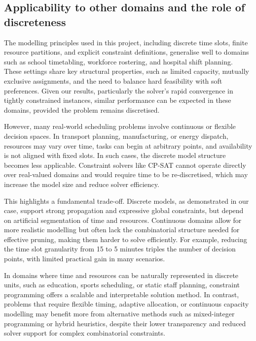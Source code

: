 \documentclass[12pt]{article}
\begin{document}
\vspace{0.5em}
\subsection{Applicability to other domains and the role of discreteness}

The modelling principles used in this project, including discrete time slots, finite resource partitions, and explicit constraint definitions, generalise well to domains such as school timetabling, workforce rostering, and hospital shift planning. These settings share key structural properties, such as limited capacity, mutually exclusive assignments, and the need to balance hard feasibility with soft preferences. Given our results, particularly the solver's rapid convergence in tightly constrained instances, similar performance can be expected in these domains, provided the problem remains discretised.

However, many real-world scheduling problems involve continuous or flexible decision spaces. In transport planning, manufacturing, or energy dispatch, resources may vary over time, tasks can begin at arbitrary points, and availability is not aligned with fixed slots. In such cases, the discrete model structure becomes less applicable. Constraint solvers like CP-SAT cannot operate directly over real-valued domains and would require time to be re-discretised, which may increase the model size and reduce solver efficiency.

This highlights a fundamental trade-off. Discrete models, as demonstrated in our case, support strong propagation and expressive global constraints, but depend on artificial segmentation of time and resources. Continuous domains allow for more realistic modelling but often lack the combinatorial structure needed for effective pruning, making them harder to solve efficiently. For example, reducing the time slot granularity from 15 to 5 minutes triples the number of decision points, with limited practical gain in many scenarios.

In domains where time and resources can be naturally represented in discrete units, such as education, sports scheduling, or static staff planning, constraint programming offers a scalable and interpretable solution method. In contrast, problems that require flexible timing, adaptive allocation, or continuous capacity modelling may benefit more from alternative methods such as mixed-integer programming or hybrid heuristics, despite their lower transparency and reduced solver support for complex combinatorial constraints.
\end{document}

